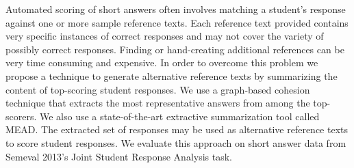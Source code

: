 Automated scoring of short answers often involves matching a student's response against one or more sample reference texts. Each reference text provided contains very specific instances of correct responses and may not cover the variety of possibly correct responses. Finding or hand-creating additional references can be very time consuming and expensive. In order to overcome this problem we propose a technique to generate alternative reference texts by summarizing the content of top-scoring student responses. We use a graph-based cohesion technique that extracts the most representative answers from among the top-scorers. We also use a state-of-the-art extractive summarization tool called MEAD. The extracted set of responses may be used as alternative reference texts to score student responses. We evaluate this approach on short answer data from Semeval 2013's Joint Student Response Analysis task.
